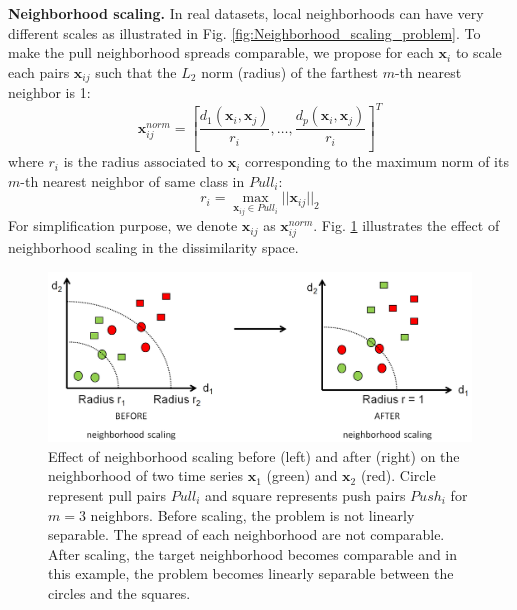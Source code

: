 \noindent \textbf{Neighborhood scaling.} 
In real datasets, local neighborhoods can have very different scales as illustrated in Fig. \ref{fig:Neighborhood_scaling_problem}. To make the pull neighborhood spreads comparable, we propose for each $\textbf{x}_i$ to scale each pairs $\textbf{x}_{ij}$ such that the $L_2$ norm (radius) of the farthest $m$-th nearest neighbor is 1:
\begin{equation}
\textbf{x}_{ij}^{norm} = \left[ \frac{d_1(\textbf{x}_{i},\textbf{x}_{j})}{r_i}, \ldots, \frac{d_p(\textbf{x}_{i},\textbf{x}_{j})}{r_i}\right] ^T \label{eq:normalization_radius}
\end{equation}
where $r_i$ is the radius associated to $\textbf{x}_i$ corresponding to the maximum norm of its $m$-th nearest neighbor of same class in $Pull_i$:
\begin{equation}
r_i = \max_{\textbf{x}_{ij} \in Pull_i} ||\textbf{x}_{ij}||_2
\end{equation}
For simplification purpose, we denote $\textbf{x}_{ij}$ as $\textbf{x}_{ij}^{norm}$. Fig. \ref{fig:Neighborhood_scaling} illustrates the effect of neighborhood scaling in the dissimilarity space.
\begin{figure}[h!]
	\centering
	\includegraphics[width=1\linewidth]{images/Neighborhood_scaling}
	\caption{Effect of neighborhood scaling before (left) and after (right) on the neighborhood of two time series $\textbf{x}_1$ (green) and $\textbf{x}_2$ (red). Circle represent pull pairs $Pull_i$ and square represents push pairs $Push_i$ for $m=3$ neighbors. Before scaling, the problem is not linearly separable. The spread of each neighborhood are not comparable. After scaling, the target neighborhood becomes comparable and in this example, the problem becomes linearly separable between the circles and the squares.}
	\label{fig:Neighborhood_scaling}
\end{figure}



